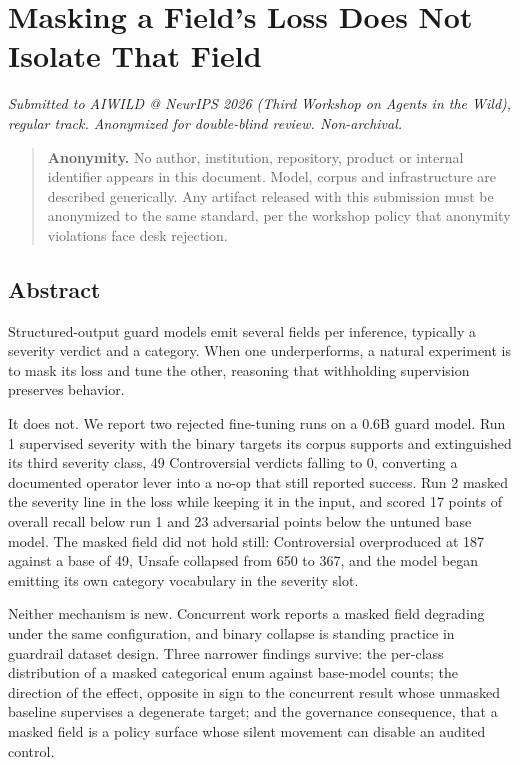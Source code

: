 \section{Masking a Field's Loss Does Not Isolate That Field}\label{masking-a-fields-loss-does-not-isolate-that-field}

\emph{Submitted to AIWILD @ NeurIPS 2026 (Third Workshop on Agents in the Wild), regular track.
Anonymized for double-blind review. Non-archival.}

\begin{quote}
\textbf{Anonymity.} No author, institution, repository, product or internal identifier appears in this
document. Model, corpus and infrastructure are described generically. Any artifact released with
this submission must be anonymized to the same standard, per the workshop policy that anonymity
violations face desk rejection.
\end{quote}

\subsection{Abstract}\label{abstract}

Structured-output guard models emit several fields per inference, typically a severity verdict and a category. When one underperforms, a natural experiment is to mask its loss and tune the
other, reasoning that withholding supervision preserves behavior.

It does not. We report two rejected fine-tuning runs on a 0.6B guard model. Run 1 supervised severity
with the binary targets its corpus supports and extinguished its third severity class, 49
Controversial verdicts falling to 0, converting a documented operator lever into a no-op that still
reported success. Run 2 masked the severity line in the loss while keeping it in
the input, and scored 17 points of overall recall below run 1 and 23 adversarial points below the
untuned base model. The masked field did not hold still: Controversial overproduced at 187
against a base of 49, Unsafe collapsed from 650 to 367, and the model began emitting its own category
vocabulary in the severity slot.

Neither mechanism is new. Concurrent work reports a masked field degrading under the same
configuration, and binary collapse is standing practice in guardrail dataset design. Three narrower
findings survive: the per-class distribution of a masked categorical enum against base-model counts;
the direction of the effect, opposite in sign to the concurrent result whose unmasked baseline
supervises a degenerate target; and the governance consequence, that a masked field is a policy
surface whose silent movement can disable an audited control.

